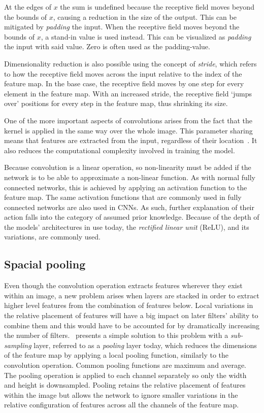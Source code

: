 At the edges of \(x\) the sum is undefined because the receptive field moves beyond the bounds of \(x\), causing a reduction in the size of the output.
This can be mitigated by \textit{padding} the input.
When the receptive field moves beyond the bounds of \(x\), a stand-in value is used instead.
This can be visualized as \textit{padding} the input with said value.
Zero is often used as the padding-value.

Dimensionality reduction is also possible using the concept of \textit{stride}, which refers to how the receptive field moves across the input relative to the index of the feature map.
In the base case, the receptive field moves by one step for every element in the feature map.
With an increased stride, the receptive field `jumps over' positions for every step in the feature map, thus shrinking its size.

One of the more important aspects of convolutions arises from the fact that the kernel is applied in the same way over the whole image.
This parameter sharing means that features are extracted from the input, regardless of their location\ \parencite{lecum1989}.
It also reduces the computational complexity involved in training the model.

Because convolution is a linear operation, so non-linearity must be added if the network is to be able to approximate a non-linear function.
As with normal fully connected networks, this is achieved by applying an activation function to the feature map.
The same activation functions that are commonly used in fully connected networks are also used in CNNs.
As such, further explanation of their action falls into the category of assumed prior knowledge.
Because of the depth of the models’ architectures in use today, the \textit{rectified linear unit} (ReLU), and its variations, are commonly used.

\subsection{Spacial pooling}
Even though the convolution operation extracts features wherever they exist within an image, a new problem arises when layers are stacked in order to extract higher level features from the combination of features below.
Local variations in the relative placement of features will have a big impact on later filters' ability to combine them and this would have to be accounted for by dramatically increasing the number of filters.\ \textcite{lecun1998gradient} presents a simple solution to this problem with a \textit{sub-sampling} layer, referred to as a \textit{pooling} layer today, which reduces the dimensions of the feature map by applying a local pooling function, similarly to the convolution operation.
Common pooling functions are maximum and average.
The pooling operation is applied to each channel separately so only the width and height is downsampled.
Pooling retains the relative placement of features within the image but allows the network to ignore smaller variations in the relative configuration of features across all the channels of the feature map.

